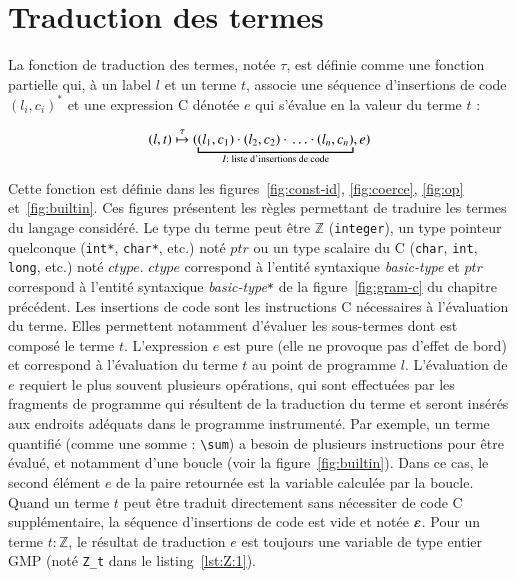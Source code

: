 \section{Traduction des termes \eacsl}
\label{sec:term}


La fonction de traduction des termes, notée $\tau$, est définie comme une
fonction partielle qui, à un label $l$ et un terme $t$, associe une séquence
d'insertions de code $(l_i, c_i)^*$ et une expression C dénotée $e$ qui s'évalue
en la valeur du terme $t$ :

\[
(l, t) \trule
(\underbracket{(l_1, c_1) \concat (l_2, c_2) \concat \ldots
  \concat (l_n, c_n)}_{I : \text{ liste d'insertions de code}}, e)
\]

Cette fonction est définie dans les figures~\ref{fig:const-id},
\ref{fig:coerce}, \ref{fig:op} et~\ref{fig:builtin}.
Ces figures présentent les règles permettant de traduire les termes du langage
\eacsl considéré.
Le type du terme peut être $\mathbb{Z}$ (\lstinline'integer'), un type pointeur
quelconque (\lstinline'int*', \lstinline'char*', etc.) noté $ptr$ ou un type
scalaire du C (\lstinline'char', \lstinline'int', \lstinline'long', etc.) noté
$ctype$.
$ctype$ correspond à l'entité syntaxique \textit{basic-type} et $ptr$
correspond à l'entité syntaxique \textit{basic-type}\lstinline'*'
de la figure~\ref{fig:gram-c} du chapitre précédent.
Les insertions de code sont les instructions C nécessaires à l'évaluation du
terme.
Elles permettent notamment d'évaluer les sous-termes dont est composé le terme
$t$.
L'expression $e$ est pure (elle ne provoque pas d'effet de bord) et correspond à
l'évaluation du terme $t$ au point de programme $l$.
L'évaluation de $e$ requiert le plus souvent plusieurs opérations, qui sont
effectuées par les fragments de programme qui résultent de la traduction du
terme et seront insérés aux endroits adéquats dans le programme instrumenté.
Par exemple, un terme quantifié (comme une somme : \lstinline'\sum') a besoin de
plusieurs instructions pour être évalué, et notamment d'une boucle (voir la
figure~\ref{fig:builtin}).
Dans ce cas, le second élément $e$ de la paire retournée est la variable
calculée par la boucle.
Quand un terme $t$ peut être traduit directement sans nécessiter de code C
supplémentaire, la séquence d'insertions de code est vide et notée $\varepsilon$.
Pour un terme $t:\mathbb{Z}$, le résultat de traduction $e$ est toujours une
variable de type entier GMP (noté \lstinline'Z_t' dans le
listing~\ref{lst:Z:1}).



